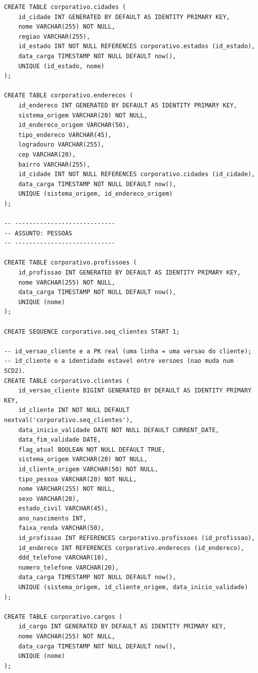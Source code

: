 {\begin{verbatim}
CREATE TABLE corporativo.cidades (
    id_cidade INT GENERATED BY DEFAULT AS IDENTITY PRIMARY KEY,
    nome VARCHAR(255) NOT NULL,
    regiao VARCHAR(255),
    id_estado INT NOT NULL REFERENCES corporativo.estados (id_estado),
    data_carga TIMESTAMP NOT NULL DEFAULT now(),
    UNIQUE (id_estado, nome)
);

CREATE TABLE corporativo.enderecos (
    id_endereco INT GENERATED BY DEFAULT AS IDENTITY PRIMARY KEY,
    sistema_origem VARCHAR(20) NOT NULL,
    id_endereco_origem VARCHAR(50),
    tipo_endereco VARCHAR(45),
    logradouro VARCHAR(255),
    cep VARCHAR(20),
    bairro VARCHAR(255),
    id_cidade INT NOT NULL REFERENCES corporativo.cidades (id_cidade),
    data_carga TIMESTAMP NOT NULL DEFAULT now(),
    UNIQUE (sistema_origem, id_endereco_origem)
);

-- ----------------------------
-- ASSUNTO: PESSOAS
-- ----------------------------

CREATE TABLE corporativo.profissoes (
    id_profissao INT GENERATED BY DEFAULT AS IDENTITY PRIMARY KEY,
    nome VARCHAR(255) NOT NULL,
    data_carga TIMESTAMP NOT NULL DEFAULT now(),
    UNIQUE (nome)
);

CREATE SEQUENCE corporativo.seq_clientes START 1;

-- id_versao_cliente e a PK real (uma linha = uma versao do cliente);
-- id_cliente e a identidade estavel entre versoes (nao muda num SCD2).
CREATE TABLE corporativo.clientes (
    id_versao_cliente BIGINT GENERATED BY DEFAULT AS IDENTITY PRIMARY KEY,
    id_cliente INT NOT NULL DEFAULT nextval('corporativo.seq_clientes'),
    data_inicio_validade DATE NOT NULL DEFAULT CURRENT_DATE,
    data_fim_validade DATE,
    flag_atual BOOLEAN NOT NULL DEFAULT TRUE,
    sistema_origem VARCHAR(20) NOT NULL,
    id_cliente_origem VARCHAR(50) NOT NULL,
    tipo_pessoa VARCHAR(20) NOT NULL,
    nome VARCHAR(255) NOT NULL,
    sexo VARCHAR(20),
    estado_civil VARCHAR(45),
    ano_nascimento INT,
    faixa_renda VARCHAR(50),
    id_profissao INT REFERENCES corporativo.profissoes (id_profissao),
    id_endereco INT REFERENCES corporativo.enderecos (id_endereco),
    ddd_telefone VARCHAR(10),
    numero_telefone VARCHAR(20),
    data_carga TIMESTAMP NOT NULL DEFAULT now(),
    UNIQUE (sistema_origem, id_cliente_origem, data_inicio_validade)
);

CREATE TABLE corporativo.cargos (
    id_cargo INT GENERATED BY DEFAULT AS IDENTITY PRIMARY KEY,
    nome VARCHAR(255) NOT NULL,
    data_carga TIMESTAMP NOT NULL DEFAULT now(),
    UNIQUE (nome)
);


\end{verbatim}}
